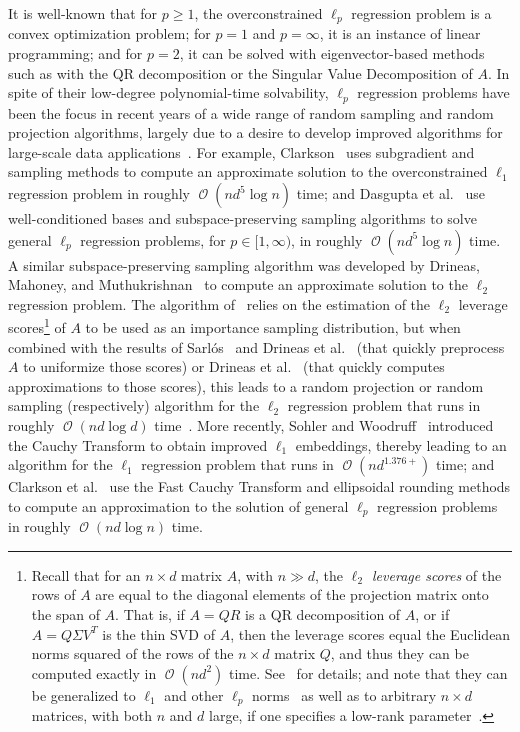 \documentclass[11pt]{article}
\DeclareMathOperator{\bigO}{\mathcal{O}}
\begin{document}
It is well-known that for $p \ge 1$, the overconstrained $\ell_p$ regression
problem is a convex optimization problem; for $p=1$ and $p=\infty$, it is an
instance of linear programming; and for $p=2$, it can be solved with
eigenvector-based methods such as with the QR decomposition or the Singular
Value Decomposition of $A$.
In spite of their low-degree polynomial-time solvability, $\ell_p$ regression
problems have been the focus in recent years of a wide range of random sampling
and random projection algorithms, largely due to a desire to develop improved
algorithms for large-scale data applications~\cite{AMT10,MSM11_TR,CDMMMW13_SODA}.
For example, Clarkson~\cite{Cla05} uses subgradient and sampling methods to
compute an approximate solution to the overconstrained $\ell_1$ regression
problem in roughly $\bigO(nd^5\log n)$ time; and Dasgupta et
al.~\cite{DDHKM09_lp_SICOMP} use well-conditioned bases and subspace-preserving
sampling algorithms to solve general $\ell_p$ regression problems, for
$p\in[1,\infty)$, in roughly $\bigO(nd^5\log n)$ time.
A similar subspace-preserving sampling algorithm was developed by Drineas,
Mahoney, and Muthukrishnan~\cite{DMM06} to compute an approximate solution to
the $\ell_2$ regression problem.
The algorithm of~\cite{DMM06} relies on the estimation of the $\ell_2$ leverage
scores\footnote{Recall that for an $n \times d$ matrix $A$, with $n \gg d$, the
  \emph{$\ell_2$ leverage scores} of the rows of $A$ are equal to the diagonal
  elements of the projection matrix onto the span of $A$.
  That is, if $A=QR$ is a QR decomposition of $A$, or if $A=Q \Sigma V^T$ is the
  thin SVD of $A$, then the leverage scores equal the Euclidean norms squared of
  the rows of the $n \times d$ matrix $Q$, and thus they can be computed exactly
  in $\bigO(nd^2)$ time.
  See~\cite{Mah-mat-rev_BOOK,DMMW12_ICML} for details; and note that they can be
  generalized to $\ell_1$ and other $\ell_p$ norms~\cite{CDMMMW13_SODA} as well as
  to arbitrary $n \times d$ matrices, with both $n$ and $d$ large, if one
  specifies a low-rank parameter~\cite{CUR_PNAS,DMMW12_ICML}.}
of $A$ to be used as an importance sampling distribution, but when combined with
the results of Sarl\'{o}s~\cite{Sarlos06} and Drineas et
al.~\cite{DMMS07_FastL2_NM10} (that quickly preprocess $A$ to uniformize those
scores) or Drineas et al.~\cite{DMMW12_ICML} (that quickly computes
approximations to those scores), this leads to a random projection or random
sampling (respectively) algorithm for the $\ell_2$ regression problem that runs
in roughly $\bigO(n d \log d)$ time~\cite{DMMS07_FastL2_NM10,Mah-mat-rev_BOOK}.
More recently, Sohler and Woodruff~\cite{SW11} introduced the Cauchy Transform
to obtain improved $\ell_1$ embeddings, thereby leading to an algorithm for the
$\ell_1$ regression problem that runs in $\bigO(nd^{1.376+})$ time; and Clarkson
et al.~\cite{CDMMMW13_SODA} use the Fast Cauchy Transform and ellipsoidal rounding
methods to compute an approximation to the solution of general $\ell_p$
regression problems in roughly $\bigO(nd \log n)$ time.
\end{document}
